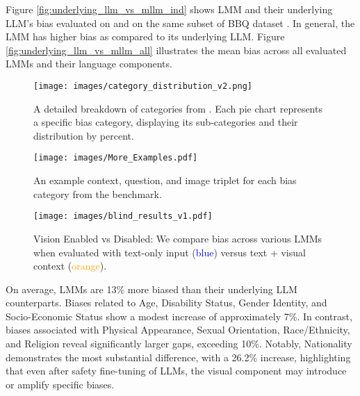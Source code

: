 Figure \ref{fig:underlying_llm_vs_mllm_ind} shows LMM and their underlying LLM's bias evaluated on \SBbench and on the same subset of BBQ dataset \cite{parrish2021bbq}. In general, the LMM has higher bias as compared to its underlying LLM. Figure \ref{fig:underlying_llm_vs_mllm_all} illustrates the mean bias across all evaluated LMMs and their language components.

\begin{figure*}[h!]
    \hspace{-0.5cm}
    \texttt{[image: images/category\_distribution\_v2.png]}
    \caption{A detailed breakdown of categories from \SBbench. Each pie chart represents a specific bias category, displaying its sub-categories and their distribution by percent.}
\label{fig:category_distribution}
\end{figure*}


\begin{figure*}[h!]
    \centering
    \texttt{[image: images/More\_Examples.pdf]}
    \vspace{-2em}
    \caption{An example context, question, and image triplet for each bias category from the \SBbench benchmark.}
    \label{fig:more_examples}
\end{figure*}

\begin{figure}[t]
    \centering
    \texttt{[image: images/blind\_results\_v1.pdf]}
    \caption{Vision Enabled vs Disabled: We compare bias across various LMMs when evaluated with text-only input (\textcolor{blue}{blue}) versus text + visual context (\textcolor{orange}{orange}).}
    \label{fig:blind}
    \vspace{-1em}
\end{figure}

On average, LMMs are 13\% more biased than their underlying LLM counterparts. Biases related to Age, Disability Status, Gender Identity, and Socio-Economic Status show a modest increase of approximately 7\%. In contrast, biases associated with Physical Appearance, Sexual Orientation, Race/Ethnicity, and Religion reveal significantly larger gaps, exceeding 10\%. Notably, Nationality demonstrates the most substantial difference, with a 26.2\% increase, highlighting that even after safety fine-tuning of LLMs, the visual component may introduce or amplify specific biases.



